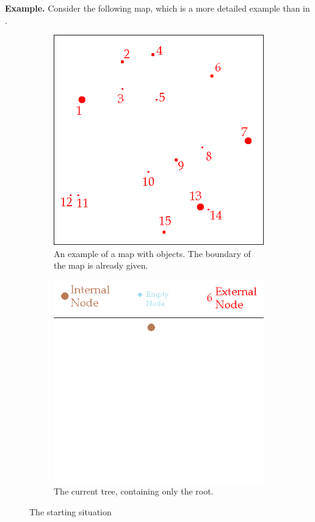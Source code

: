 \newpage
\textbf{Example.} Consider the following map, which is a more detailed example than in \cite{barneshut}.
\begin{figure}[H]
\centering
\begin{subfigure}{0.35\textwidth}
\includegraphics[width=\textwidth]{barneshut_map.png}
\caption{An example of a map with objects. The boundary of the map is already given.}
\end{subfigure}\hspace{1cm}
\begin{subfigure}{0.35\textwidth}
\includegraphics[width=\textwidth]{barneshut_tree_root.png}
\caption{The current tree, containing only the root.}
\end{subfigure}
\caption{The starting situation}
\end{figure}
